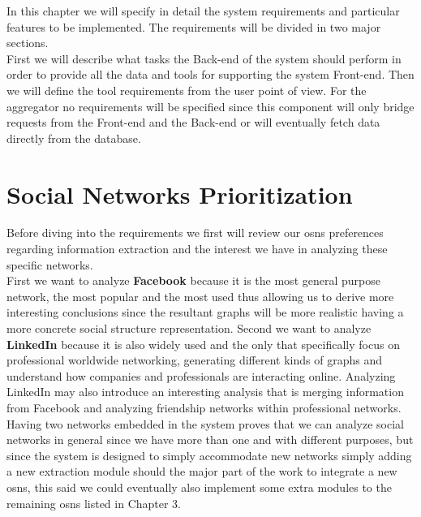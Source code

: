 In this chapter we will specify in detail the system requirements and particular features to be implemented. The requirements
will be divided in two major sections.\\
\indent First we will describe what tasks the Back-end of the system should perform in order to provide
all the data and tools for supporting the system Front-end. Then we will define the tool requirements from
the user point of view. For the aggregator no requirements will be specified since this component will only bridge
requests from the Front-end and the Back-end or will eventually fetch data directly from the database.\\

\section{Social Networks Prioritization}
Before diving into the requirements we first will review our \glspl{osn} preferences regarding information extraction and the
interest we have in analyzing these specific networks.\\
\indent First we want to analyze \textbf{Facebook} because it is the most general purpose network, the most popular and the most used
thus allowing us to derive more interesting conclusions since the resultant graphs will be more realistic having a more concrete social structure
representation. Second we want to analyze \textbf{LinkedIn} because it is also widely used and the only that specifically
focus on professional worldwide networking, generating different kinds of graphs and understand how companies and professionals
are interacting online. Analyzing LinkedIn may also introduce an interesting analysis that is merging information from Facebook and
analyzing friendship networks within professional networks.\\
\indent Having two networks embedded in the system proves that we can analyze social networks in general since we have more
than one and with different purposes, but since the system is designed to simply accommodate new networks simply adding
a new extraction module should the major part of the work to integrate a new \glspl{osn}, this said we could eventually
also implement some extra modules to the remaining \glspl{osn} listed in Chapter 3.




